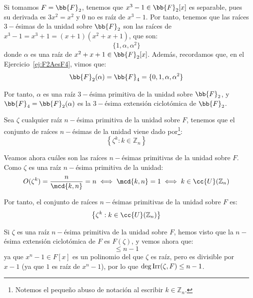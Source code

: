 \begin{ejemplo}
    Si tomamos $F=\bb{F}_2$, tenemos que $x^3-1\in \bb{F}_2[x]$ es separable, pues su derivada es $3x^2 = x^2$ y $0$ no es raíz de $x^3-1$. Por tanto, tenemos que las raíces $3-$ésimas de la unidad sobre $\bb{F}_2$ son las raíces de $x^3-1 = x^3+1 = (x+1)(x^2+x+1)$, que son:
    \begin{equation*}
        \{1,\alpha,\alpha^2\}
    \end{equation*}
    donde $\alpha$ es una raíz de $x^2+x+1\in \bb{F}_2[x]$. Además, recordamos que, en el Ejercicio~\ref{ej:F2AesF4}, vimos que:
    \begin{equation*}
        \bb{F}_2(\alpha) = \bb{F}_4 = \{0,1,\alpha,\alpha^2\}
    \end{equation*}

    Por tanto, $\alpha$ es una raíz $3-$ésima primitiva de la unidad sobre $\bb{F}_2$, y $\bb{F}_4 = \bb{F}_2(\alpha)$ es la $3-$ésima extensión ciclotómica de $\bb{F}_2$.
\end{ejemplo}

\begin{ejemplo}
    Sea $\zeta$ cualquier raíz $n-$ésima primitiva de la unidad sobre $F$, tenemos que el conjunto de raíces $n-$ésimas de la unidad viene dado por\footnote{Notemos el pequeño abuso de notación al escribir $k\in \mathbb{Z}_n$.}:
    \begin{equation*}
        \left\{\zeta^k : k\in \mathbb{Z}_n\right\}
    \end{equation*}

    Veamos ahora cuáles son las raíces $n-$ésimas primitivas de la unidad sobre $F$. Como $\zeta$ es una raíz $n-$ésima primitiva de la unidad:
    \begin{equation*}
        O(\zeta^k) = \frac{n}{\mcd\{k,n\}} = n \iff \mcd\{k,n\} = 1 \iff k\in \cc{U}(\mathbb{Z}_n)
    \end{equation*}

    Por tanto, el conjunto de raíces $n-$ésimas primitivas de la unidad sobre $F$ es:
    \begin{equation*}
        \left\{\zeta^k : k\in \cc{U}(\mathbb{Z}_n)\right\}
    \end{equation*}
\end{ejemplo}

\begin{observacion}
    Si $\zeta$ es una raíz $n-$ésima primitiva de la unidad sobre $F$, hemos visto que la $n-$ésima extensión ciclotómica de $F$ es $F(\zeta)$, y vemos ahora que:
    \begin{equation*}
        [F(\zeta):F] \leq n-1
    \end{equation*}
    ya que $x^n-1\in F[x]$ es un polinomio del que $\zeta$ es raíz, pero es divisible por $x-1$ (ya que $1$ es raíz de $x^n-1$), por lo que $\deg\operatorname{Irr}(\zeta,F)\leq n-1$.
\end{observacion}

